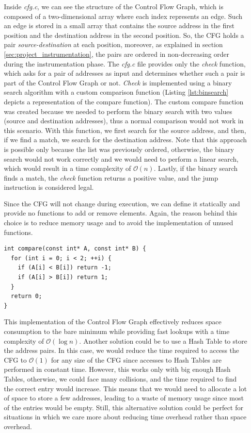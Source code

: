 Inside \textit{cfg.c}, we can see the structure of the Control Flow Graph, which
is composed of a two-dimensional array where each index represents an edge. Such
an edge is stored in a small array that contains the source address in the first
position and the destination address in the second position. So, the CFG holds a
pair \textit{source-destination} at each position, moreover, as explained in section
\ref{sec:project_instrumentation}, the pairs are ordered in non-decreasing order
during the instrumentation phase. The \textit{cfg.c} file provides only the
\textit{check} function, which asks for a pair of addresses as input and
determines whether such a pair is part of the Control Flow Graph or not. \textit{Check}
is implemented using a binary search algorithm with a custom comparison function
(Listing \ref{lst:binsearch} depicts a representation of the compare function). The
custom compare function was created because we needed to perform the binary search
with two values (source and destination addresses), thus a normal comparison
would not work in this scenario. With this function, we first search for the
source address, and then, if we find a match, we search for the destination address.
Note that this approach is possible only because the list was previously ordered,
otherwise, the binary search would not work correctly and we would need to
perform a linear search, which would result in a time complexity of $\mathcal{O}(
n)$. Lastly, if the binary search finds a match, the \textit{check} function returns
a positive value, and the jump instruction is considered legal.

Since the CFG will not change during execution, we can define it statically and provide
no functions to add or remove elements. Again, the reason behind this choice is to
reduce memory usage and to avoid the implementation of unused functions. \\
\begin{lstlisting}[style=CStyle, caption= Comparison function for binary search, label={lst:binsearch}]
int compare(const int* A, const int* B) {
  for (int i = 0; i < 2; ++i) {
    if (A[i] < B[i]) return -1;
    if (A[i] > B[i]) return 1;
  }
  return 0;
}
\end{lstlisting}

This implementation of the Control Flow Graph effectively reduces space consumption
to the bare minimum while providing fast lookups with a time complexity of $\mathcal{O}
(\log{n})$. Another solution could be to use a Hash Table to store the address
pairs. In this case, we would reduce the time required to access the CFG to
$\mathcal{O}(1)$ for any size of the CFG since accesses to Hash Tables are
performed in constant time. However, this works only with big enough Hash Tables,
otherwise, we could face many collisions, and the time required to find the correct
entry would increase. This means that we would need to allocate a lot of space
to store a few addresses, leading to a waste of memory usage since most of the entries
would be empty. Still, this alternative solution could be perfect for situations
in which we care more about reducing time overhead rather than space overhead.

